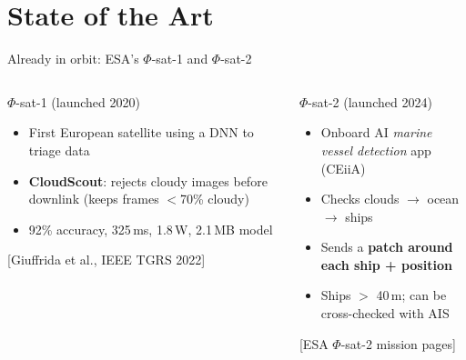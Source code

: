 \documentclass[aspectratio=169,10pt]{beamer}
\newcommand{\phisat}[1]{$\Phi$-sat-#1}
\newcommand{\src}[1]{{\scriptsize\color{muted}[#1]}}
\begin{document}
\section{State of the Art}

\begin{frame}{Already in orbit: ESA's \phisat{1} and \phisat{2}}
\begin{columns}[T]
\begin{block}{\phisat{1} (launched 2020)}
\footnotesize
\begin{itemize}
  \item First European satellite using a DNN to triage data
  \item \textbf{CloudScout}: rejects cloudy images before downlink (keeps frames $<$70\% cloudy)
  \item 92\% accuracy, 325\,ms, 1.8\,W, 2.1\,MB model
\end{itemize}
\src{Giuffrida et al., IEEE TGRS 2022}
\end{block}
\begin{block}{\phisat{2} (launched 2024)}
\footnotesize
\begin{itemize}
  \item Onboard AI \emph{marine vessel detection} app (CEiiA)
  \item Checks clouds $\rightarrow$ ocean $\rightarrow$ ships
  \item Sends a \textbf{patch around each ship + position}
  \item Ships $>$ 40\,m; can be cross-checked with AIS
\end{itemize}
\src{ESA \phisat{2} mission pages}
\end{block}
\end{columns}
\vspace{1mm}
\begin{center}
\end{center}
\end{frame}
\end{document}
